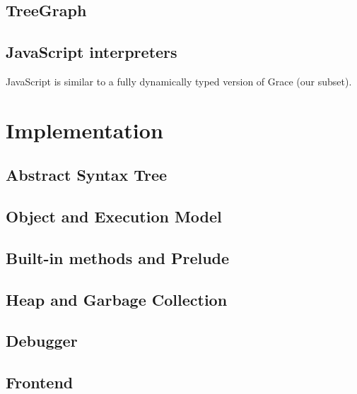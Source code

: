 \section{TreeGraph}\label{treegraph}

\section{JavaScript interpreters}\label{javascript-interpreters}

JavaScript is similar to a fully dynamically typed version of Grace (our
subset).

\chapter{Implementation}\label{implementation}

\section{Abstract Syntax Tree}\label{abstract-syntax-tree}

\section{Object and Execution Model}\label{object-and-execution-model}

\section{Built-in methods and
Prelude}\label{built-in-methods-and-prelude}

\section{Heap and Garbage Collection}\label{heap-and-garbage-collection}

\section{Debugger}\label{debugger}

\section{Frontend}\label{frontend}
